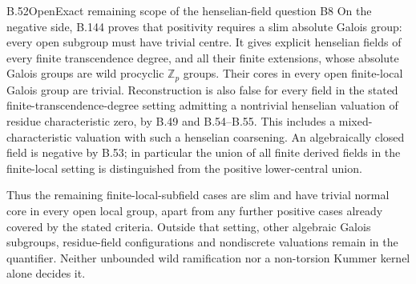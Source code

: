 \begin{claim}{B.52}{Open}{Exact remaining scope of the henselian-field question B8}
On the negative side, B.144 proves that positivity
requires a slim absolute Galois group: every open
subgroup must have trivial centre.
It gives explicit henselian fields of every finite
transcendence degree, and all their finite extensions,
whose absolute Galois groups are wild procyclic
$\mathbb Z_p$ groups. Their cores in every open
finite-local Galois group are trivial.
Reconstruction is also false for every field in the
stated finite-transcendence-degree setting admitting
a nontrivial henselian valuation of residue
characteristic zero, by B.49 and B.54--B.55.
This includes a mixed-characteristic valuation with
such a henselian coarsening.
An algebraically closed field is negative by B.53;
in particular the union of all finite derived fields
in the finite-local setting is distinguished from
the positive lower-central union.

Thus the remaining finite-local-subfield cases are
slim and have trivial normal core in every open
local group, apart from any further positive cases
already covered by the stated criteria.
Outside that setting, other algebraic Galois
subgroups, residue-field configurations and
nondiscrete valuations remain in the quantifier.
Neither unbounded wild ramification nor a
non-torsion Kummer kernel alone decides it.
\end{claim}

